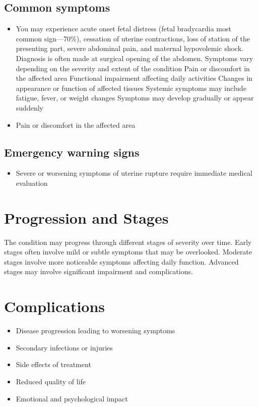 \subsection{Common symptoms}
\begin{itemize}[noitemsep]
  \item You may experience acute onset fetal distress (fetal bradycardia most common sign---70\%), cessation of uterine contractions, loss of station of the presenting part, severe abdominal pain, and maternal hypovolemic shock. Diagnosis is often made at surgical opening of the abdomen. Symptoms vary depending on the severity and extent of the condition Pain or discomfort in the affected area Functional impairment affecting daily activities Changes in appearance or function of affected tissues Systemic symptoms may include fatigue, fever, or weight changes Symptoms may develop gradually or appear suddenly
  \item Pain or discomfort in the affected area
  \end{itemize}

\subsection{Emergency warning signs}
\begin{itemize}[noitemsep]
  \item Severe or worsening symptoms of uterine rupture require immediate medical evaluation
\end{itemize}
\section{Progression and Stages}
The condition may progress through different stages of severity over time. Early stages often involve mild or subtle symptoms that may be overlooked. Moderate stages involve more noticeable symptoms affecting daily function. Advanced stages may involve significant impairment and complications.
\section{Complications}
\begin{itemize}[noitemsep]
  \item Disease progression leading to worsening symptoms
  \item Secondary infections or injuries
  \item Side effects of treatment
  \item Reduced quality of life
  \item Emotional and psychological impact
\end{itemize}
